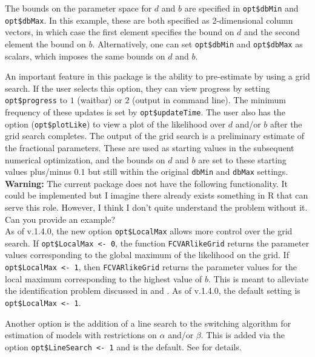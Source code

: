 \documentclass[11pt,letterpaper]{paper}
\let\fct=\texttt
\begin{document}
The bounds on the parameter space for $d$ and $b$ are specified in \verb|opt$dbMin| and \verb|opt$dbMax|. In this example, these are both specified as 2-dimensional column vectors, in which case the first element specifies the bound on $d$ and the second element the bound on $b$. Alternatively, one can set \verb|opt$dbMin| and \verb|opt$dbMax| as scalars, which imposes the same bounds on $d$ and $b$. 

An important feature in this package is the ability to pre-estimate by using a grid search. If the user selects this option, they can view progress by setting \verb|opt$progress| to $1$ (waitbar) or $2$ (output in command line). The minimum frequency of these updates is set by \verb|opt$updateTime|. The user also has the option (\verb|opt$plotLike|) to view a plot of the likelihood over $d$ and/or $b$ after the grid search completes. The output of the grid search is a preliminary estimate of the fractional parameters. These are used as starting values in the subsequent numerical optimization, and the bounds on $d$ and $b$ are set to these starting values plus/minus $0.1$ but still within the original \verb|dbMin| and \verb|dbMax| settings. \\

\textbf{Warning: }
The current package does not have the following functionality. 
It could be implemented but I imagine there already exists something in R that can serve this role. 
However, I think I don't quite understand the problem without it. 
Can you provide an example? \\

As of v.1.4.0, the new option \verb|opt$LocalMax| allows more control over the grid search. If \verb|opt$LocalMax <- 0|, the function \fct{FCVARlikeGrid} returns the parameter values corresponding to the global maximum of the likelihood on the grid. If \verb|opt$LocalMax <- 1|, then \fct{FCVARlikeGrid} returns the parameter values for the local maximum corresponding to the highest value of $b$. This is meant to alleviate the identification problem discussed in \citet[Section 2.3]{johniel2010} and \cite{Carlini2014}. As of v.1.4.0, the default setting is \verb|opt$LocalMax <- 1|.

Another option is the addition of a line search to the switching algorithm for estimation of models with restrictions on $\alpha$ and/or $\beta$. This is added via the option \verb|opt$LineSearch <- 1| and is the default. See \citet[Section 2.2]{Doornik2016} for details.
\end{document}
